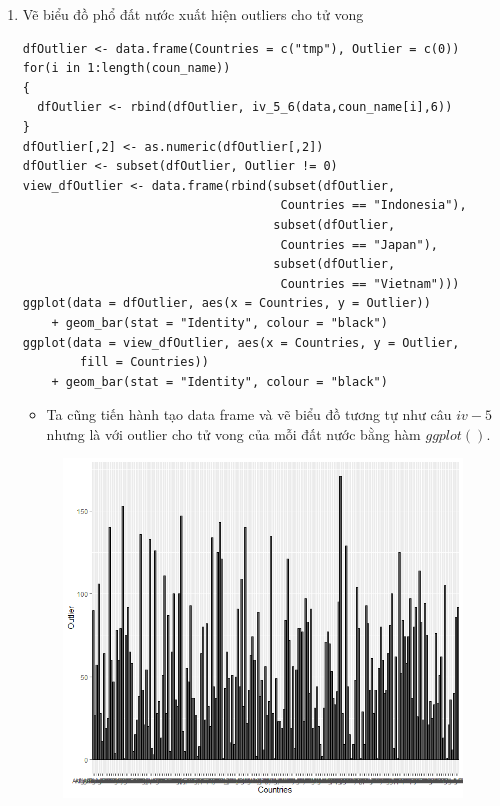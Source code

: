 \documentclass[a4paper]{article}
\theoremstyle{definition}
\begin{document}
\begin{enumerate}[i)]
\begin{enumerate}[1)]
    \item Vẽ biểu đồ phổ đất nước xuất hiện outliers cho tử vong
    \lstset{
    title=Source code}
\begin{lstlisting}[frame=single]  
dfOutlier <- data.frame(Countries = c("tmp"), Outlier = c(0))
for(i in 1:length(coun_name))
{
  dfOutlier <- rbind(dfOutlier, iv_5_6(data,coun_name[i],6))
}
dfOutlier[,2] <- as.numeric(dfOutlier[,2])
dfOutlier <- subset(dfOutlier, Outlier != 0)
view_dfOutlier <- data.frame(rbind(subset(dfOutlier, 
                                    Countries == "Indonesia"),
                                   subset(dfOutlier, 
                                    Countries == "Japan"),
                                   subset(dfOutlier, 
                                    Countries == "Vietnam")))
ggplot(data = dfOutlier, aes(x = Countries, y = Outlier))
    + geom_bar(stat = "Identity", colour = "black")
ggplot(data = view_dfOutlier, aes(x = Countries, y = Outlier, 
        fill = Countries))
    + geom_bar(stat = "Identity", colour = "black")
\end{lstlisting}
\begin{itemize}
    \item Ta cũng tiến hành tạo data frame và vẽ biểu đồ tương tự như câu $iv-5$ nhưng là với outlier cho tử vong của mỗi đất nước bằng hàm $ggplot()$.
\end{itemize}
\begin{figure}[h!]
	\begin{center}
        \includegraphics[scale=0.6]{Images/IV/iv (6) - 1.png}

\end{center}
\end{figure}
\end{enumerate}
\end{enumerate}
\end{document}
